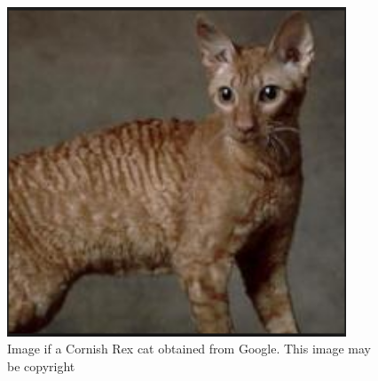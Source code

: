 %

\begin{figure}[!h]
  \centering
   \includegraphics[width=0.9\textwidth]{crex.png}
  \caption{Image if a Cornish Rex cat obtained from Google. This image may be copyright}
  \label{fig:crex}
\end{figure}

%

